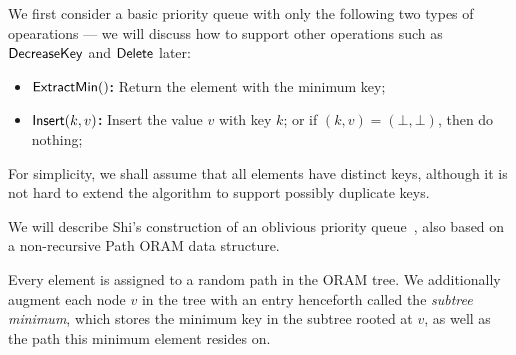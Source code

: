\documentclass[11pt]{article}
\begin{document}
We first consider a basic priority queue with only the following
two types of opearations --- we will discuss how to support other operations such as
${\sf DecreaseKey}$ and ${\sf Delete}$ later:

\begin{itemize}
    \item \textbf{${\sf ExtractMin}()$:} Return the element with the minimum key;
    \item \textbf{${\sf Insert}(k, v)$:} Insert the value $v$ with key $k$; 
or if $(k, v) = (\bot, \bot)$, then do nothing; 
\end{itemize}
For simplicity, we shall assume that all elements have distinct
keys, although it is not hard to extend
the algorithm
to support possibly 
duplicate keys.


We will describe Shi's construction of an oblivious  
priority queue~\cite{shi-opq}, also based on a non-recursive
Path ORAM data structure.

Every element is assigned to a random path in the ORAM tree.  
We additionally augment each node $v$ in the tree
with an entry henceforth called the {\it subtree minimum}, 
which stores the minimum 
key in the subtree rooted at $v$, as well as the path this minimum element resides on. 
\end{document}

